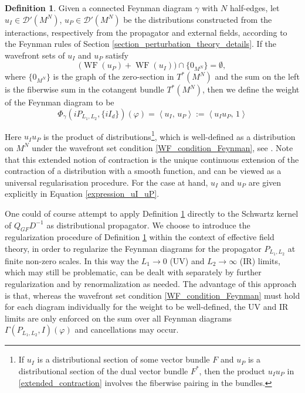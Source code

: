\documentclass[reqno]{amsart}
\theoremstyle{definition}
\newtheorem{defn}[thm]{Definition}
\theoremstyle{remark}
\renewcommand{\phi}{\varphi}
\newcommand{\D}{\mathcal{D}'}
\newcommand{\pair}[2]{\left\langle #1,\, #2 \right\rangle}
\DeclareMathOperator{\WF}{WF}
\begin{document}
\begin{defn}
\label{def_feynman_contraction}
Given a connected Feynman diagram $\gamma$ with $N$ half-edges, let ${u_I \in \D(M^N)}$, ${u_P \in \D(M^N)}$ be the distributions constructed from the interactions, respectively from the propagator and external fields, according to the Feynman rules of Section \ref{section_perturbation_theory_details}. If the wavefront sets of $u_I$ and $u_P$ satisfy
\begin{equation}
\label{WF_condition_Feynman}
    \big(\WF(u_P)+\WF(u_I)\big) \cap \{0_{M^N}\} = \emptyset,
\end{equation}
where $\{0_{M^N}\}$ is the graph of the zero-section in $T^*(M^N)$ and the sum on the left is the fiberwise sum in the cotangent bundle $T^*(M^N)$, then we define the weight of the Feynman diagram to be
\begin{equation}
\label{extended_contraction}
    \Phi_\gamma(iP_{L_1,L_2},\{iI_d\})(\varphi) = \pair{u_I}{u_P} := \pair{u_I u_P}{1}
\end{equation}
\end{defn}
Here $u_I u_P$ is the product of distributions\footnote{If $u_I$ is a distributional section of some vector bundle $F$ and $u_P$ is a distributional section of the dual vector bundle $F^*$, then the product $u_Iu_P$ in \eqref{extended_contraction} involves the fiberwise pairing in the bundles.}, which is well-defined as a distribution on $M^N$ under the wavefront set condition \eqref{WF_condition_Feynman}, see \cite[Theorem 8.2.10]{hormander1}. Note that this extended notion of contraction is the unique continuous extension of the contraction of a distribution with a smooth function, and can be viewed as a universal regularisation procedure. For the case at hand, $u_I$ and $u_P$ are given explicitly in Equation \eqref{expression_uI_uP}.

\begin{rmk}
\label{UV_IR_limits}
One could of course attempt to apply Definition \ref{def_feynman_contraction} directly to the Schwartz kernel of $Q_{GF}D^{-1}$ as distributional propagator. We choose to introduce the regularization procedure of Definition \ref{def_feynman_contraction} within the context of effective field theory, in order to regularize the Feynman diagrams for the propagator $P_{L_1,L_2}$ at finite non-zero scales. In this way the $L_1\to 0$ (UV) and $L_2\to\infty$ (IR) limits, which may still be problematic, can be dealt with separately by further regularization and by renormalization as needed. The advantage of this approach is that, whereas the wavefront set condition \eqref{WF_condition_Feynman} must hold for each diagram individually for the weight to be well-defined, the UV and IR limits are only enforced on the sum over all Feynman diagrams $\Gamma(P_{L_1,L_2},I)(\phi)$ and cancellations may occur.
\end{rmk}
\end{document}
